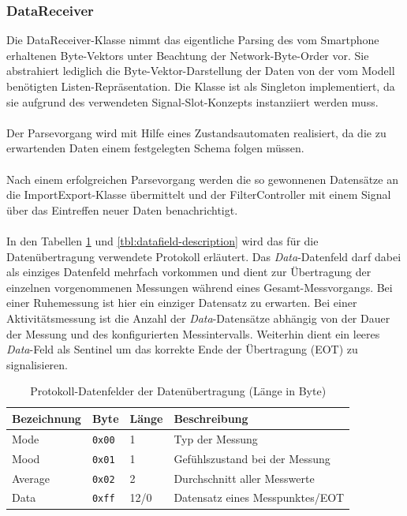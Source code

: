 \subsubsection{DataReceiver}
Die DataReceiver-Klasse nimmt das eigentliche Parsing des vom Smartphone erhaltenen Byte-Vektors unter Beachtung der Network-Byte-Order vor. Sie abstrahiert lediglich die Byte-Vektor-Darstellung der Daten von der vom Modell benötigten Listen-Repräsentation. Die Klasse ist als Singleton implementiert, da sie aufgrund des verwendeten Signal-Slot-Konzepts instanziiert werden muss.\\
\\
Der Parsevorgang wird mit Hilfe eines Zustandsautomaten realisiert, da die zu erwartenden Daten einem festgelegten Schema folgen müssen.\\
\\
Nach einem erfolgreichen Parsevorgang werden die so gewonnenen Datensätze an die ImportExport-Klasse übermittelt und der FilterController mit einem Signal über das Eintreffen neuer Daten benachrichtigt.\\
\\
In den Tabellen \ref{tbl:pdu} und \ref{tbl:datafield-description} wird das für die Datenübertragung verwendete Protokoll erläutert. Das \textit{Data}-Datenfeld darf dabei als einziges Datenfeld mehrfach vorkommen und dient zur Übertragung der einzelnen vorgenommenen Messungen während eines Gesamt-Messvorgangs. Bei einer Ruhemessung ist hier ein einziger Datensatz zu erwarten. Bei einer Aktivitätsmessung ist die Anzahl der \textit{Data}-Datensätze abhängig von der Dauer der Messung und des konfigurierten Messintervalls. Weiterhin dient ein leeres \textit{Data}-Feld als Sentinel um das korrekte Ende der Übertragung (EOT) zu signalisieren.
\begin{table}[h]
	\centering
		\begin{tabularx}{\textwidth}{l|l|l|X}
			\hline
			Bezeichnung & Byte & Länge & Beschreibung \\
			\hline
			\hline
			Mode & \texttt{0x00} & 1 & Typ der Messung\\
			\hline
			Mood & \texttt{0x01} & 1 & Gefühlszustand bei der Messung\\
			\hline
			Average & \texttt{0x02} & 2 & Durchschnitt aller Messwerte\\
			\hline
			Data & \texttt{0xff} & 12/0 & Datensatz eines Messpunktes/EOT\\
			\hline
		\end{tabularx}
		\caption{Protokoll-Datenfelder der Datenübertragung (Länge in Byte)}
		\label{tbl:pdu}
\end{table}

